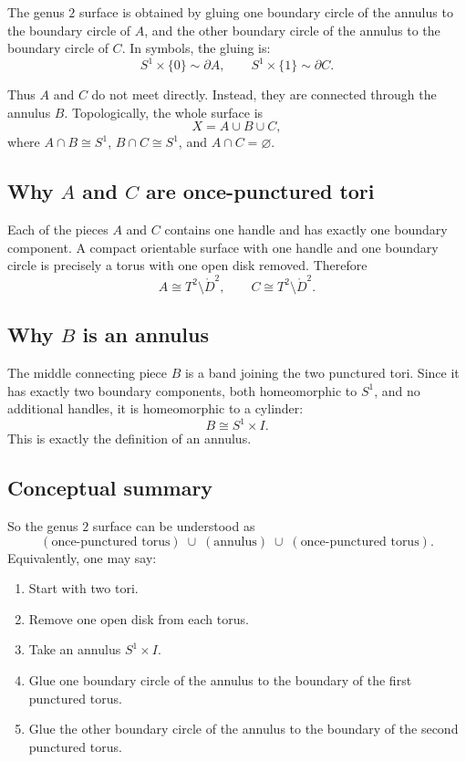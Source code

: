 \documentclass[12pt,a4paper]{article}
\theoremstyle{notespace}
\begin{document}
The genus \(2\) surface is obtained by gluing one boundary circle of the annulus to the boundary circle of \(A\), and the other boundary circle of the annulus to the boundary circle of \(C\). In symbols, the gluing is:
\[
S^1\times\{0\}\sim \partial A,
\qquad
S^1\times\{1\}\sim \partial C.
\]

Thus \(A\) and \(C\) do not meet directly. Instead, they are connected through the annulus \(B\). Topologically, the whole surface is
\[
X=A\cup B\cup C,
\]
where \(A\cap B\cong S^1\), \(B\cap C\cong S^1\), and \(A\cap C=\varnothing\).

\subsection{Why \(A\) and \(C\) are once-punctured tori}

Each of the pieces \(A\) and \(C\) contains one handle and has exactly one boundary component. A compact orientable surface with one handle and one boundary circle is precisely a torus with one open disk removed. Therefore
\[
A \cong T^2\setminus \mathring{D}^2,
\qquad
C \cong T^2\setminus \mathring{D}^2.
\]

\subsection{Why \(B\) is an annulus}

The middle connecting piece \(B\) is a band joining the two punctured tori. Since it has exactly two boundary components, both homeomorphic to \(S^1\), and no additional handles, it is homeomorphic to a cylinder:
\[
B \cong S^1\times I.
\]
This is exactly the definition of an annulus.

\subsection{Conceptual summary}

So the genus \(2\) surface can be understood as
\[
(\text{once-punctured torus})
\;\cup\;
(\text{annulus})
\;\cup\;
(\text{once-punctured torus}).
\]
Equivalently, one may say:

\begin{enumerate}
	\item Start with two tori.
	\item Remove one open disk from each torus.
	\item Take an annulus \(S^1\times I\).
	\item Glue one boundary circle of the annulus to the boundary of the first punctured torus.
	\item Glue the other boundary circle of the annulus to the boundary of the second punctured torus.
\end{enumerate}
\end{document}

